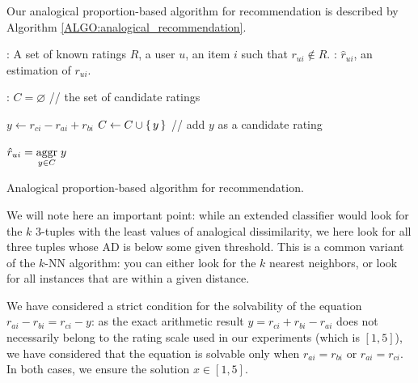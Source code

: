Our analogical proportion-based algorithm for recommendation is described by
Algorithm \ref{ALGO:analogical_recommendation}.
 \begin{algorithm}[!ht]
       \begin{algorithmic}

      : A set of known ratings $R$, a user $u$, an item
      $i$ such that $r_{ui} \notin R$.
      : $\hat{r}_{ui}$, an estimation of $r_{ui}$.

      :
      \STATE $C = \varnothing$ \quad \quad // the set of candidate ratings

      \STATE  $y \leftarrow r_{ci} - r_{ai} + r_{bi}$
      \STATE $C \gets C \cup \set{y}$ \quad // add $y$ as a candidate rating
	  \ENDFOR

    \STATE $\hat{r}_{ui} = \underset{y \in C}{\operatorname{aggr}}\; y$

\end{algorithmic}
     \caption{Analogical proportion-based algorithm for recommendation.}
       \label{ALGO:analogical_reco}
\end{algorithm}

We will note here an important point: while an extended classifier would look
for the $k$ $3$-tuples with the least values of analogical dissimilarity, we
here look for all three tuples whose AD is below some given threshold. This is
a common variant of the $k$-NN algorithm: you can either look for the $k$
nearest neighbors, or look for all instances that are within a given distance.

We have considered a strict condition for the solvability of the equation
$r_{ai} - r_{bi} = r_{ci} - y$: as the exact arithmetic result $y=r_{ci} +
r_{bi} -r_{ai}$ does not necessarily belong to the rating scale used in our
experiments (which is $[1,5]$), we have
considered that the equation is solvable only when $r_{ai}=r_{bi}$ or
$r_{ai}=r_{ci}$. In both cases, we ensure the solution $x \in
[1,5]$.

